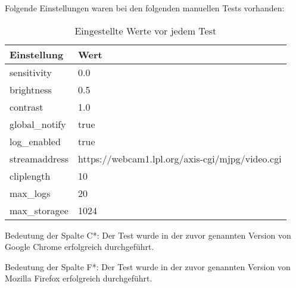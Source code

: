 Folgende Einstellungen waren bei den folgenden manuellen Tests vorhanden:

\begin{table}[]
	\begin{tabular}{|l|l|}
		\cline{1-2}
		\textbf{Einstellung} & \textbf{Wert} \\ \hline
		
		sensitivity & 0.0 \\ \hline
		
		brightness & 0.5 \\ \hline
		
		contrast & 1.0 \\ \hline
		
		global\_notify & true \\ \hline
		
		log\_enabled & true \\ \hline
		
		streamaddress & https://webcam1.lpl.org/axis-cgi/mjpg/video.cgi \\ \hline
		
		cliplength & 10 \\ \hline
		
		max\_logs & 20 \\ \hline
		
		max\_storagee & 1024 \\ \hline
	\end{tabular}
\caption{Eingestellte Werte vor jedem Test}
\label{tab:eingestellte_werte_vor_tests}
\end{table}

Bedeutung der Spalte C*: Der Test wurde in der zuvor genannten Version von Google Chrome erfolgreich durchgeführt.

Bedeutung der Spalte F*: Der Test wurde in der zuvor genannten Version von Mozilla Firefox erfolgreich durchgeführt.

\newpage

